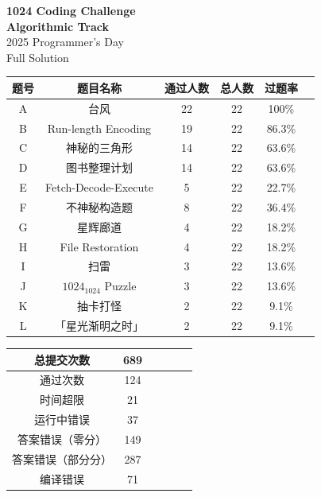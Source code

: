 \documentclass[14pt,a4paper]{article}
\begin{document}
\begin{center}
  {\Huge \bfseries 1024 Coding Challenge}\\[1em]
  {\Huge \bfseries Algorithmic Track}\\[1em]
  { \Large 2025 Programmer's Day }\\[2em]
  {\Large Full Solution}\\[1em]
\end{center}


\begin{table}[htbp]
  \centering
  \setlength{\tabcolsep}{8pt}  %
  \renewcommand{\arraystretch}{1.3} %
  \begin{tabular}{|c|c|c|c|c|c|}
    \hline
     题号 & 题目名称 & 通过人数 & 总人数 & 过题率  \\ \hline %
     A& 台风 & 22 & 22 & 100\% \\ \hline %
     B& Run-length Encoding & 19 & 22 & 86.3\%  \\ \hline %
     C& 神秘的三角形 & 14 & 22 & 63.6\%  \\     \hline %
     D& 图书整理计划 & 14 & 22 & 63.6\% \\ \hline %
     E& Fetch-Decode-Execute & 5 & 22 & 22.7\%  \\ \hline %
     F& 不神秘构造题 & 8 & 22 & 36.4\% \\ \hline %
     G& 星辉廊道 & 4 & 22 & 18.2\%  \\ \hline %
     H& File Restoration & 4 & 22 & 18.2\%  \\ \hline %
     I& 扫雷 & 3 & 22 & 13.6\%  \\ \hline %
     J& $1024_{1024}$ Puzzle & 3 & 22 & 13.6\%  \\ \hline %
     K& 抽卡打怪 & 2 & 22 & 9.1\%  \\ \hline %
     L& 「星光渐明之时」 & 2 & 22 & 9.1\%  \\ \hline %
  \end{tabular}
\end{table}

\begin{table}[htbp]
  \centering
  \setlength{\tabcolsep}{8pt}  %
  \renewcommand{\arraystretch}{1.3} %
  \begin{tabular}{|c|c|c|c|c|c|}
    \hline
    总提交次数 & 689 \\ \hline
    通过次数 & 124 \\ \hline
    时间超限 & 21 \\ \hline
    运行中错误 & 37 \\ \hline
    答案错误（零分） & 149 \\ \hline
    答案错误（部分分） & 287 \\ \hline
    编译错误 & 71 \\ \hline
  \end{tabular}
\end{table}
\end{document}
